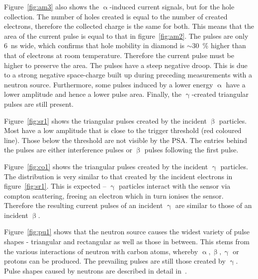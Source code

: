 Figure~\ref{fig:am3} also shows the $\upalpha$-induced current signals, but for the hole collection. The number of holes created is equal to the number of created electrons, therefore the collected charge is the same for both. This means that the area of the current pulse is equal to that in figure~\ref{fig:am2}. The pulses are only 6~ns wide, which confirms that hole mobility in diamond is $\sim$30~\% higher than that of electrons at room temperature. Therefore the current pulse must be higher to preserve the area. The pulses have a steep negative droop. This is due to a strong negative space-charge built up during preceding measurements with a neutron source. Furthermore, some pulses induced by a lower energy $\upalpha$ have a lower amplitude and hence a lower pulse area. Finally, the $\upgamma$-created triangular pulses are still present. 

Figure~\ref{fig:sr1} shows the triangular pulses created by the incident $\upbeta$ particles. Most have a low amplitude that is close to the trigger threshold (red coloured line). Those below the threshold are not visible by the PSA. The entries behind the pulses are either interference pulses or $\upbeta$ pulses following the first pulse.

Figure~\ref{fig:co1} shows the triangular pulses created by the incident $\upgamma$ particles. The distribution is very similar to that created by the incident electrons in figure~\ref{fig:sr1}. This is expected -- $\upgamma$ particles interact with the sensor via compton scattering, freeing an electron which in turn ionises the sensor. Therefore the resulting current pulses of an incident $\upgamma$ are similar to those of an incident $\upbeta$.

Figure~\ref{fig:pu1} shows that the neutron source causes the widest variety of pulse shapes - triangular and rectangular as well as those in between. This stems from the various interactions of neutron with carbon atoms, whereby $\upalpha, \upbeta, \upgamma$ or protons can be produced. The prevailing pulses are still those created by $\upgamma$. %
Pulse shapes caused by neutrons are described in detail in~\cite{PAVEL:00003, CHRISSI:00005}. 







